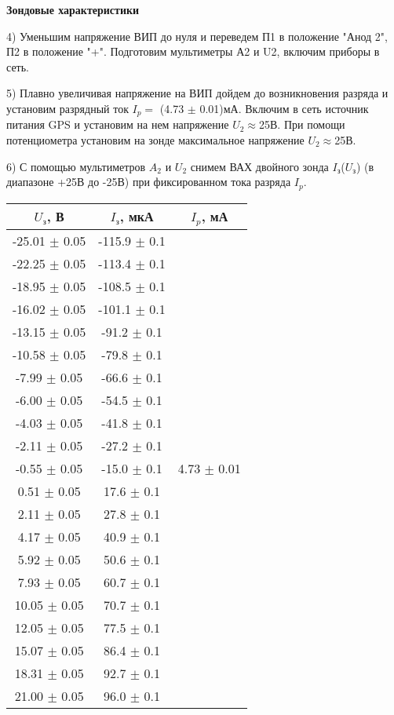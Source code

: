 \documentclass[a4paper,12pt]{article}
\begin{document}
\par \textbf{Зондовые характеристики}

\par 4) Уменьшим напряжение ВИП до нуля и переведем П1 в положение "Анод 2", П2 в положение "+". Подготовим мультиметры А2 и U2, включим приборы в сеть. 

\par 5) Плавно увеличивая напряжение на ВИП дойдем до возникновения разряда и установим разрядный ток $I_p = $ (4.73 $\pm$ 0.01)мА. Включим в сеть источник питания GPS и установим на нем напряжение $U_2\approx$25В. При помощи потенциометра установим на зонде максимальное напряжение $U_2\approx$25В. 

\par 6) С помощью мультиметров $A_2$ и $U_2$ снимем ВАХ двойного зонда $I_{\text{з}}$($U_{\text{з}}$) (в диапазоне +25В до -25В) при фиксированном тока разряда $I_p$.

\begin{tabular}{|c|c|c|}
	\hline
	$U_{\text{з}}$, В & $I_{\text{з}}$, мкА &  $I_p$, мА \\
	\hline
	-25.01 $\pm$ 0.05 & -115.9 $\pm$ 0.1 & \multirow{21}{*}{4.73 $\pm$ 0.01}\\
	\cline{1-2} 
	-22.25 $\pm$ 0.05 & -113.4 $\pm$ 0.1 & \\
	\cline{1-2}
	-18.95 $\pm$ 0.05 & -108.5 $\pm$ 0.1 & \\
	\cline{1-2}
	-16.02 $\pm$ 0.05 & -101.1 $\pm$ 0.1 & \\
	\cline{1-2}
	-13.15 $\pm$ 0.05 & -91.2 $\pm$ 0.1 & \\
	\cline{1-2}
	-10.58 $\pm$ 0.05 & -79.8 $\pm$ 0.1 & \\
	\cline{1-2}
	-7.99 $\pm$ 0.05 & -66.6 $\pm$ 0.1 & \\
	\cline{1-2}
	-6.00 $\pm$ 0.05 & -54.5 $\pm$ 0.1 & \\
	\cline{1-2}
	-4.03 $\pm$ 0.05 & -41.8 $\pm$ 0.1 & \\
	\cline{1-2}
	-2.11 $\pm$ 0.05 & -27.2 $\pm$ 0.1 & \\
	\cline{1-2}
	-0.55 $\pm$ 0.05 & -15.0 $\pm$ 0.1 & \\
	\cline{1-2}
	0.51 $\pm$ 0.05 & 17.6 $\pm$ 0.1 & \\
	\cline{1-2}
	2.11 $\pm$ 0.05 & 27.8 $\pm$ 0.1 & \\
	\cline{1-2}
	4.17 $\pm$ 0.05 & 40.9 $\pm$ 0.1 & \\
	\cline{1-2}
	5.92 $\pm$ 0.05 & 50.6 $\pm$ 0.1 & \\
	\cline{1-2}
	7.93 $\pm$ 0.05 & 60.7 $\pm$ 0.1 & \\
	\cline{1-2}
	10.05 $\pm$ 0.05 & 70.7 $\pm$ 0.1 & \\
	\cline{1-2}
	12.05 $\pm$ 0.05 & 77.5 $\pm$ 0.1 & \\
	\cline{1-2}
	15.07 $\pm$ 0.05 & 86.4 $\pm$ 0.1 & \\
	\cline{1-2}
	18.31 $\pm$ 0.05 & 92.7 $\pm$ 0.1 & \\
	\cline{1-2}
	21.00 $\pm$ 0.05 & 96.0 $\pm$ 0.1 & \\
	\hline
\end{tabular}
\end{document}
